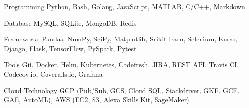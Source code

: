

\begin{cvskills}

  \cvskill
    {Programming} %
    {Python, Bash, Golang, JavaScript, MATLAB, C/C++, Markdown} %

  \cvskill
    {Database} %
    {MySQL, SQLite, MongoDB, Redis} %


  \cvskill
    {Frameworks} %
    {Pandas, NumPy, SciPy, Matplotlib, Scikit-learn, Selenium, Keras, Django, Flask, TensorFlow, PySpark, Pytest} %



  \cvskill
    {Tools} %
    {Git, Docker, Helm, Kubernetes, Codefresh, JIRA, REST API, Travis CI, Codecov.io, Coveralls.io, Grafana} %

  \cvskill
    {Cloud Technology} %
    {GCP (Pub/Sub, GCS, Cloud SQL, Stackdriver, GKE, GCE, GAE, AutoML), AWS (EC2, S3, Alexa Skills Kit, SageMaker)} 

    

\end{cvskills}
